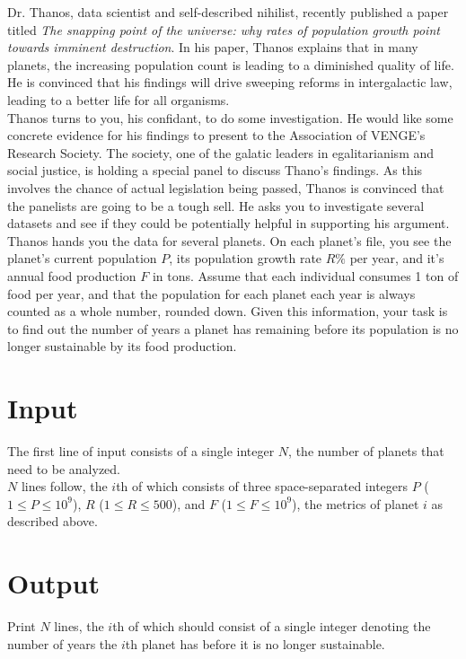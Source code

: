 
\noindent Dr. Thanos, data scientist and self-described nihilist, recently published a paper titled \textit{The snapping point of the universe: why rates of population growth point towards imminent destruction}. In his paper, Thanos explains that in many planets, the increasing population count is leading to a diminished quality of life. He is convinced that his findings will drive sweeping reforms in intergalactic law, leading to a better life for all organisms.\\

Thanos turns to you, his confidant, to do some investigation. He would like some concrete evidence for his findings to present to the Association of VENGE's Research Society. The society, one of the galatic leaders in egalitarianism and social justice, is holding a special panel to discuss Thano's findings. As this involves the chance of actual legislation being passed, Thanos is convinced that the panelists are going to be a tough sell. He asks you to investigate several datasets and see if they could be potentially helpful in supporting his argument.\\

Thanos hands you the data for several planets. On each planet's file, you see the planet's current population $P$, its population growth rate $R\%$ per year, and it's annual food production $F$ in tons. Assume that each individual consumes 1 ton of food per year, and that the population for each planet each year is always counted as a whole number, rounded down. Given this information, your task is to find out the number of years a planet has remaining before its population is no longer sustainable by its food production.

\section*{Input}
The first line of input consists of a single integer $N$, the number of planets that need to be analyzed.\\

\noindent $N$ lines follow, the $i$th of which consists of three space-separated integers $P$ ($1 \leq P \leq 10^9$), $R$ ($1 \le R \le 500$), and $F$ ($1 \leq F \leq 10^9$), the metrics of planet $i$ as described above.

\section*{Output}
Print $N$ lines, the $i$th of which should consist of a single integer denoting the number of years the $i$th planet has before it is no longer sustainable.